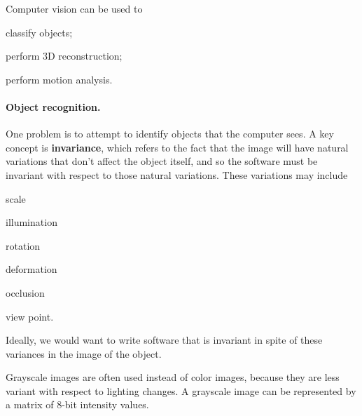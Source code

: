 \documentclass[10pt,a4paper]{article}
\newenvironment{itemize_packed}{
\begin{itemize}
\setlength{\itemsep}{0pt}
\setlength{\parskip}{0pt}
}{\end{itemize}}
\begin{document}
Computer vision can be used to
\begin{itemize_packed}
\item classify objects;
\item perform 3D reconstruction;
\item perform motion analysis.
\end{itemize_packed}

\paragraph{Object recognition.} One problem is to attempt to identify objects that the computer sees. A key concept is \textbf{invariance}, which refers to the fact that the image will have natural variations that don't affect the object itself, and so the software must be invariant with respect to those natural variations. These variations may include
\begin{itemize_packed}
\item scale
\item illumination
\item rotation
\item deformation
\item occlusion
\item view point.
\end{itemize_packed}
Ideally, we would want to write software that is invariant in spite of these variances in the image of the object.

Grayscale images are often used instead of color images, because they are less variant with respect to lighting changes. A grayscale image can be represented by a matrix of 8-bit intensity values.
\end{document}
